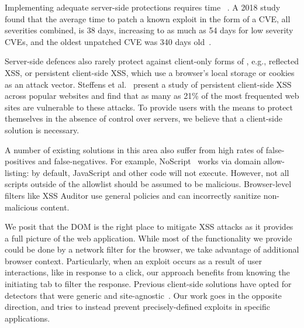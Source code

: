 Implementing adequate server-side protections requires time ~\cite{Xu:2006:TPE:1267336.1267345,DBLP:conf/sec/Nguyen-TuongGGSE05,Pietraszek:2005:DAI:2146257.2146267,Bisht:2008:XPD:1428322.1428325}.
A 2018 study found that the average time to patch a known exploit in the form of a \ac{CVE}, all severities combined, is 38 days, increasing to as much as 54 days for low severity \ac{CVE}s, and the oldest unpatched \ac{CVE} was 340 days old~\cite{Rapid7}.



Server-side defences also rarely protect against client-only forms of
\xss, e.g., reflected \ac{XSS}, or persistent
client-side \ac{XSS}, which use a browser's local storage or cookies
as an attack vector. Steffens et
al.~\cite{DBLP:conf/ndss/SteffensRJS19} present a study of persistent
client-side \ac{XSS} across popular websites and find that as many as
21\% of the most frequented web sites are vulnerable to these attacks.
%
To provide users with the means to protect themselves in the absence
of control over servers, we believe that a client-side
solution is necessary.

A number of existing solutions in this area also suffer from high
rates of false-positives and false-negatives. %
For example, NoScript~\cite{Noscript} works via domain allow-listing: by
default, JavaScript and other code will not execute. However,
not all scripts outside of the allowlist should be assumed to be
malicious. Browser-level filters like XSS Auditor use
general policies and can incorrectly sanitize non-malicious
content.

We posit that the DOM is the right place to mitigate XSS
  attacks as it provides a full picture of the web application. While
most of the functionality we provide could be done by a network filter
for the browser, we take advantage of additional browser context.
%
Particularly, when an exploit occurs as a result of user interactions,
like in response to a click, our approach
benefits from knowing the initiating tab to filter the
response. Previous client-side solutions have opted for detectors that were generic and site-agnostic~\cite{Kirda:2009:CCS:2639535.2639808,Jim:2007:DSI:1242572.1242654,Hallaraker:2005:DMJ:1078029.1078861}. Our work goes in the opposite direction, and tries to instead prevent precisely-defined exploits in specific applications. 

